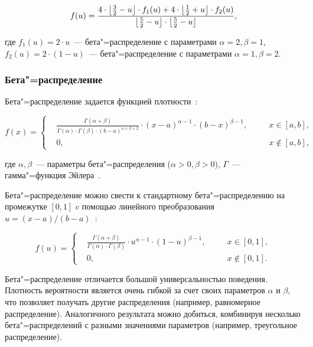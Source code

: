 \documentclass[a4paper, article, 14pt]{extarticle}
\begin{document}
\begin{equation}\label{eq:simpson_distribtuion_with_beta_distribution}
	f(u) = \frac{4 \cdot \floor*{\frac{3}{2} - u} \cdot f_1(u) + 4 \cdot \floor*{\frac{1}{2} + u} \cdot f_2(u)}{\floor*{\frac{5}{2} - u} \cdot \floor*{\frac{5}{2} - u}},
\end{equation}

\noindent где $f_1(u) = 2 \cdot u$~--- бета"=распределение с параметрами $\alpha = 2, \beta = 1$,\\$f_2(u) = 2 \cdot (1 - u)$~--- бета"=распределение с параметрами $\alpha = 1, \beta = 2$.

\subsubsection{Бета"=распределение}\label{sec:beta_distribtuion}

Бета"=распределение задается функцией плотности~\cite{prohorov}:

\begin{equation}\label{eq:beta_distribtuion}
	f(x) =
	\left\{
		\begin{aligned}
			&\frac{\Gamma(\alpha + \beta)}{\Gamma(\alpha) \cdot \Gamma(\beta) \cdot (b - a)^{\alpha + \beta + 2}} \cdot (x - a)^{\alpha - 1} \cdot (b - x)^{\beta - 1}, \quad && x \in [a, b],\\
			&0, \quad && x \notin [a, b],
		\end{aligned}
	\right.
\end{equation}

\noindent где $\alpha, \beta$~--- параметры бета"=распределения ($\alpha > 0, \beta > 0$), $\Gamma$~--- гамма"=функция Эйлера~\cite{arsenin}.

Бета"=распределение можно свести к стандартному бета"=распределению на промежутке $[0, 1]$ c помощью линейного преобразования\\$u = (x - a) / (b - a)$~\cite{koroluk}:

\begin{equation}\label{eq:standard_beta_distribtuion}
	f(u) =
	\left\{
		\begin{aligned}
			&\frac{\Gamma(\alpha + \beta)}{\Gamma(\alpha) \cdot \Gamma(\beta)} \cdot u^{\alpha - 1} \cdot (1 - u)^{\beta - 1}, \quad && x \in [0, 1],\\
			&0, \quad && x \notin [0, 1].
		\end{aligned}
	\right.
\end{equation}

Бета"=распределение отличается большой универсальностью поведения. Плотность вероятности является очень гибкой за счет своих параметров $\alpha$ и $\beta$, что позволяет получать другие распределения (например, равномерное распределение). Аналогичного результата можно добиться, комбинируя несколько бета"=распределений с разными значениями параметров (например, треугольное распределение).
\end{document}
